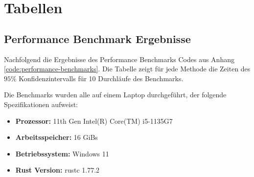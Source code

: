 \chapter{Tabellen}
\label{anhang:chapter-tabellen}

\section{Performance Benchmark Ergebnisse}
\label{anhang:section-tabellen-benchmark}

Nachfolgend die Ergebnisse des Performance Benchmarks Codes aus Anhang \ref{code:performance-benchmarks}. Die Tabelle zeigt für jede Methode die Zeiten des $95\%$ Konfidenzintervalls für 10 Durchläufe des Benchmarks.

Die Benchmarks wurden alle auf einem Laptop durchgeführt, der folgende Spezifikationen aufweist:

\begin{itemize}
    \item \vspace{-0.1cm} \textbf{Prozessor:} 11th Gen Intel(R) Core(TM) i5-1135G7
    \item \vspace{-0.1cm} \textbf{Arbeitsspeicher:} 16 \acsp{GiB}
    \item \vspace{-0.1cm} \textbf{Betriebssystem:} Windows 11
    \item \vspace{-0.1cm} \textbf{Rust Version:} rustc 1.77.2
\end{itemize}

\vspace*{1.25cm}




